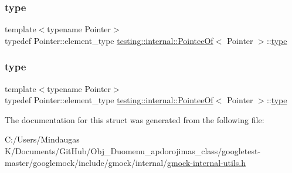 \mbox{\label{structtesting_1_1internal_1_1_pointee_of_aca4d92c8f978e47a8695e82cffc11837}} 
\subsubsection{\texorpdfstring{type}{type}\hspace{0.1cm}{\footnotesize\ttfamily [2/3]}}
{\footnotesize\ttfamily template$<$typename Pointer$>$ \\
typedef Pointer\+::element\+\_\+type \mbox{\hyperlink{structtesting_1_1internal_1_1_pointee_of}{testing\+::internal\+::\+Pointee\+Of}}$<$ Pointer $>$\+::\mbox{\hyperlink{structtesting_1_1internal_1_1_pointee_of_aca4d92c8f978e47a8695e82cffc11837}{type}}}

\mbox{\label{structtesting_1_1internal_1_1_pointee_of_aca4d92c8f978e47a8695e82cffc11837}} 
\subsubsection{\texorpdfstring{type}{type}\hspace{0.1cm}{\footnotesize\ttfamily [3/3]}}
{\footnotesize\ttfamily template$<$typename Pointer$>$ \\
typedef Pointer\+::element\+\_\+type \mbox{\hyperlink{structtesting_1_1internal_1_1_pointee_of}{testing\+::internal\+::\+Pointee\+Of}}$<$ Pointer $>$\+::\mbox{\hyperlink{structtesting_1_1internal_1_1_pointee_of_aca4d92c8f978e47a8695e82cffc11837}{type}}}



The documentation for this struct was generated from the following file\+:\begin{DoxyCompactItemize}
\item 
C\+:/\+Users/\+Mindaugas K/\+Documents/\+Git\+Hub/\+Obj\+\_\+\+Duomenu\+\_\+apdorojimas\+\_\+class/googletest-\/master/googlemock/include/gmock/internal/\mbox{\hyperlink{googletest-master_2googlemock_2include_2gmock_2internal_2gmock-internal-utils_8h}{gmock-\/internal-\/utils.\+h}}\end{DoxyCompactItemize}
